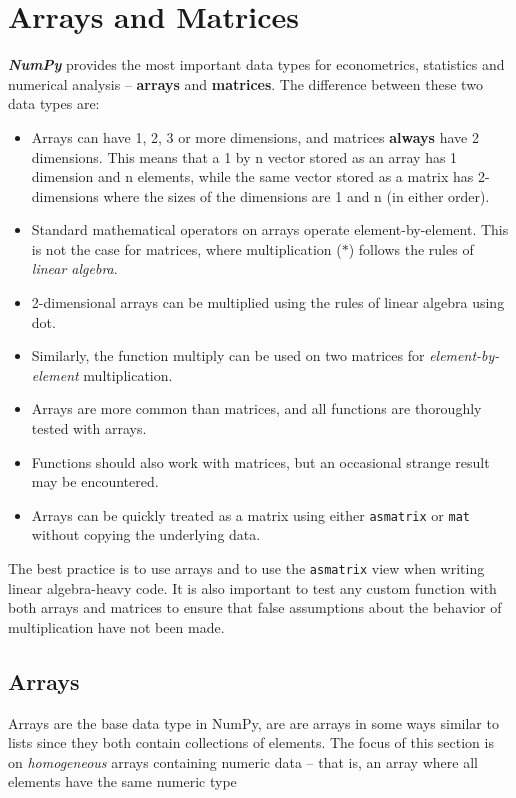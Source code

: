 \documentclass[Pydata.tex]{subfiles}
\begin{document}
 
\section{Arrays and Matrices}
\textit{\textbf{NumPy}} provides the most important data types for econometrics, statistics and numerical analysis – \textbf{arrays}
and \textbf{matrices}. The difference between these two data types are:
\begin{itemize}
\item Arrays can have 1, 2, 3 or more dimensions, and matrices \textbf{always} have 2 dimensions. This means
that a 1 by n vector stored as an array has 1 dimension and n elements, while the same vector stored
as a matrix has 2-dimensions where the sizes of the dimensions are 1 and n (in either order).
\item  Standard mathematical operators on arrays operate element-by-element. This is not the case for
matrices, where multiplication ($\ast$) follows the rules of \textit{linear algebra}.
\item 2-dimensional arrays can be
multiplied using the rules of linear algebra using dot. 
\item Similarly, the function multiply can be used
on two matrices for \textit{element-by-element} multiplication.
\item  Arrays are more common than matrices, and all functions are thoroughly tested with arrays. 
\item Functions
should also work with matrices, but an occasional strange result may be encountered.
\item  Arrays can be quickly treated as a matrix using either \texttt{asmatrix} or \texttt{mat} without copying the underlying
data.
\end{itemize}
The best practice is to use arrays and to use the \texttt{asmatrix} view when writing linear algebra-heavy code. It is
also important to test any custom function with both arrays and matrices to ensure that false assumptions
about the behavior of multiplication have not been made.

\subsection{Arrays}
Arrays are the base data type in NumPy, are are arrays in some ways similar to lists since they both contain
collections of elements. The focus of this section is on \textit{homogeneous} arrays containing numeric data
– that is, an array where all elements have the same numeric type
\end{document}
